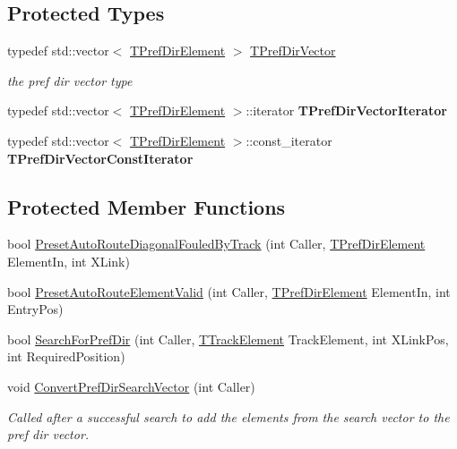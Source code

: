 \subsection*{Protected Types}
\begin{DoxyCompactItemize}
\item 
\mbox{\label{class_t_one_pref_dir_a7162736e4bbe36fbac7a57ce395fcd14}} 
typedef std\+::vector$<$ \mbox{\hyperlink{class_t_pref_dir_element}{T\+Pref\+Dir\+Element}} $>$ \mbox{\hyperlink{class_t_one_pref_dir_a7162736e4bbe36fbac7a57ce395fcd14}{T\+Pref\+Dir\+Vector}}
\begin{DoxyCompactList}\small\item\em the pref dir vector type \end{DoxyCompactList}\item 
\mbox{\label{class_t_one_pref_dir_a8a905cfdce2439be93d45b66339b7382}} 
typedef std\+::vector$<$ \mbox{\hyperlink{class_t_pref_dir_element}{T\+Pref\+Dir\+Element}} $>$\+::iterator {\bfseries T\+Pref\+Dir\+Vector\+Iterator}
\item 
\mbox{\label{class_t_one_pref_dir_a53624ed7b429b42aa57cfe5551f5df71}} 
typedef std\+::vector$<$ \mbox{\hyperlink{class_t_pref_dir_element}{T\+Pref\+Dir\+Element}} $>$\+::const\+\_\+iterator {\bfseries T\+Pref\+Dir\+Vector\+Const\+Iterator}
\end{DoxyCompactItemize}
\subsection*{Protected Member Functions}
\begin{DoxyCompactItemize}
\item 
bool \mbox{\hyperlink{class_t_one_pref_dir_ae0e03d494164fe961da51b0be8492934}{Preset\+Auto\+Route\+Diagonal\+Fouled\+By\+Track}} (int Caller, \mbox{\hyperlink{class_t_pref_dir_element}{T\+Pref\+Dir\+Element}} Element\+In, int X\+Link)
\item 
bool \mbox{\hyperlink{class_t_one_pref_dir_ab35c683ba0ec156d19d4db991046b7d2}{Preset\+Auto\+Route\+Element\+Valid}} (int Caller, \mbox{\hyperlink{class_t_pref_dir_element}{T\+Pref\+Dir\+Element}} Element\+In, int Entry\+Pos)
\item 
bool \mbox{\hyperlink{class_t_one_pref_dir_a82c6a19d67ada7059491afae05ced4a4}{Search\+For\+Pref\+Dir}} (int Caller, \mbox{\hyperlink{class_t_track_element}{T\+Track\+Element}} Track\+Element, int X\+Link\+Pos, int Required\+Position)
\item 
\mbox{\label{class_t_one_pref_dir_a482d1c69a674eec4db0190b78659c495}} 
void \mbox{\hyperlink{class_t_one_pref_dir_a482d1c69a674eec4db0190b78659c495}{Convert\+Pref\+Dir\+Search\+Vector}} (int Caller)
\begin{DoxyCompactList}\small\item\em Called after a successful search to add the elements from the search vector to the pref dir vector. \end{DoxyCompactList}\end{DoxyCompactItemize}
